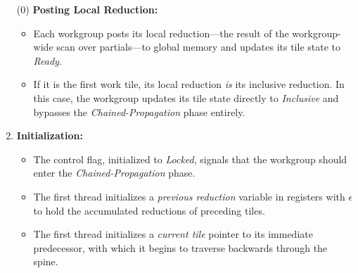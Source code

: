 \documentclass[sigconf]{acmart}
\begin{document}
\begin{enumerate}
  \item[(0)] \textbf{Posting Local Reduction:}
        \begin{itemize}
          \item Each workgroup posts its local reduction---the result of the workgroup-wide scan over partials---to global memory and updates its tile state to \emph{Ready}.
          \item If it is the first work tile, its local reduction \emph{is} its inclusive reduction. In this case, the workgroup updates its tile state directly to \emph{Inclusive} and bypasses the \emph{Chained-Propagation} phase entirely.
        \end{itemize}

  \item \textbf{Initialization:}
        \begin{itemize}
          \item The control flag, initialized to \emph{Locked}, signals that the workgroup should enter the \emph{Chained-Propagation} phase.
          \item The first thread initializes a \emph{previous reduction} variable in registers with $\epsilon$ to hold the accumulated reductions of preceding tiles.
          \item The first thread initializes a \emph{current tile} pointer to its immediate predecessor, with which it begins to traverse backwards through the spine.
        \end{itemize}


\end{enumerate}
\end{document}
